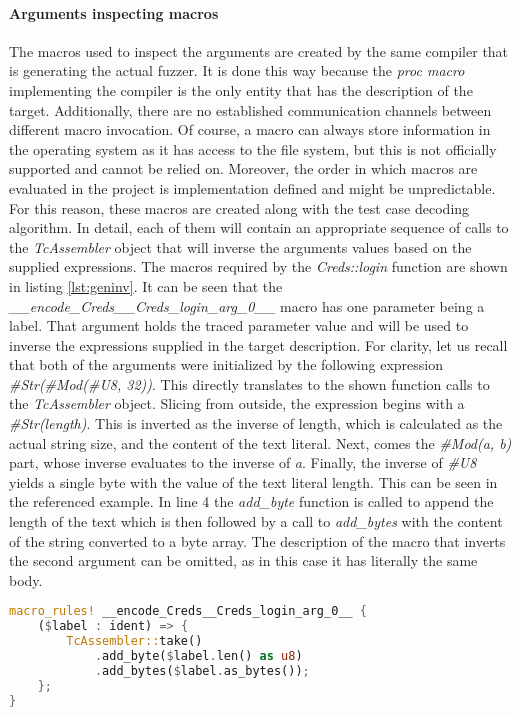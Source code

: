 \paragraph{Arguments inspecting macros}
The macros used to inspect the arguments are created by the same compiler that is generating the actual fuzzer. It is done this way because the \textit{proc macro} implementing the compiler is the only entity that has the description of the target. Additionally, there are no established communication channels between different macro invocation. Of course, a macro can always store information in the operating system as it has access to the file system, but this is not officially supported and cannot be relied on. Moreover, the order in which macros are evaluated in the project is implementation defined and might be unpredictable. For this reason, these macros are created along with the test case decoding algorithm. In detail, each of them will contain an appropriate sequence of calls to the \textit{TcAssembler} object that will inverse the arguments values based on the supplied expressions. The macros required by the \textit{Creds::login} function are shown in listing \ref{lst:geninv}. It can be seen that the \textit{\_\_encode\_Creds\_\_Creds\_login\_arg\_0\_\_} macro has one parameter being a label. That argument holds the traced parameter value and will be used to inverse the expressions supplied in the target description. For clarity, let us recall that both of the arguments were initialized by the following expression \textit{\#Str(\#Mod(\#U8, 32))}. This directly translates to the shown function calls to the \textit{TcAssembler} object. Slicing from outside, the expression begins with a \textit{\#Str(length)}. This is inverted as the inverse of length, which is calculated as the actual string size, and the content of the text literal. Next, comes the \textit{\#Mod(a, b)} part, whose inverse evaluates to the inverse of \textit{a}. Finally, the inverse of \textit{\#U8} yields a single byte with the value of the text literal length. This can be seen in the referenced example. In line 4 the \textit{add\_byte} function is called to append the length of the text which is then followed by a call to \textit{add\_bytes} with the content of the string converted to a byte array. The description of the macro that inverts the second argument can be omitted, as in this case it has literally the same body.

\begin{minipage}{\linewidth}
\begin{lstlisting}[language=rust,caption={Generated macros which inverse the arguments.},label={lst:geninv}]
macro_rules! __encode_Creds__Creds_login_arg_0__ {
    ($label : ident) => {
        TcAssembler::take()
            .add_byte($label.len() as u8)
            .add_bytes($label.as_bytes());
    };
}
\end{lstlisting}
\end{minipage}

